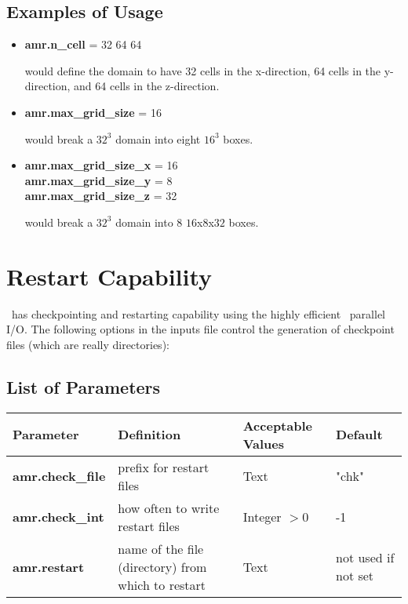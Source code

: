 \subsection{Examples of Usage}

\begin{itemize}

\item {\bf amr.n\_cell} = 32 64 64

would define the domain to have 32 cells in the x-direction, 64 cells in the y-direction, 
and 64 cells in the z-direction.

\item {\bf amr.max\_grid\_size} = 16

would break a $32^3$ domain into eight $16^3$ boxes.

\item {\bf amr.max\_grid\_size\_x} = 16 \\
      {\bf amr.max\_grid\_size\_y} =  8 \\
      {\bf amr.max\_grid\_size\_z} = 32

would break a $32^3$ domain into 8 $16$x$8$x$32$ boxes.

\end{itemize}

\section{Restart Capability}

\mfix\ has checkpointing and restarting capability using the highly efficient \amrex\ parallel I/O.
The following options in the inputs file control the generation of checkpoint files (which are really
directories):\\

\subsection{List of Parameters}

\begin{table*}[h]
\begin{scriptsize}
\begin{center}
\begin{tabular}{|l|l|l|l|} \hline
Parameter & Definition & Acceptable Values &Default\\
\hline
{\bf amr.check\_file} & prefix for restart files & Text & "chk" \\
{\bf amr.check\_int}  & how often to write restart files & Integer $> 0$ & -1  \\
{\bf amr.restart}     & name of the file (directory) from which to restart & Text & not used if not set \\
\hline
\end{tabular}
\end{center}
\end{scriptsize}
\end{table*}

